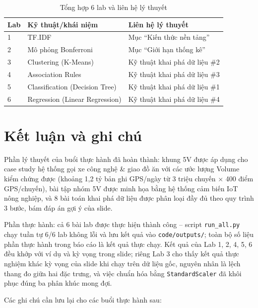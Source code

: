 \documentclass[12pt,a4paper,oneside]{article}
\begin{document}
\begin{table}[H]
\centering
\caption{Tổng hợp 6 lab và liên hệ lý thuyết}
\label{tab:tonghop}
\begin{tabularx}{\textwidth}{l X X}
\toprule
Lab & Kỹ thuật/khái niệm & Liên hệ lý thuyết \\
\midrule
1 & TF.IDF & Mục ``Kiến thức nền tảng'' \\
2 & Mô phỏng Bonferroni & Mục ``Giới hạn thống kê'' \\
3 & Clustering (K-Means) & Kỹ thuật khai phá dữ liệu \#2 \\
4 & Association Rules & Kỹ thuật khai phá dữ liệu \#3 \\
5 & Classification (Decision Tree) & Kỹ thuật khai phá dữ liệu \#1 \\
6 & Regression (Linear Regression) & Kỹ thuật khai phá dữ liệu \#4 \\
\bottomrule
\end{tabularx}
\end{table}

\section{Kết luận và ghi chú}

Phần lý thuyết của buổi thực hành đã hoàn thành: khung 5V được áp dụng cho case study hệ thống gọi xe công nghệ \& giao đồ ăn với các ước lượng Volume kiểm chứng được (khoảng 1,2 tỷ bản ghi GPS/ngày từ 3 triệu chuyến $\times$ 400 điểm GPS/chuyến), bài tập nhóm 5V được minh họa bằng hệ thống cảm biến IoT nông nghiệp, và 8 bài toán khai phá dữ liệu được phân loại đầy đủ theo quy trình 3 bước, bám đáp án gợi ý của slide.

Phần thực hành: cả 6 bài lab được thực hiện thành công -- script \texttt{run\_all.py} chạy tuần tự 6/6 lab không lỗi và lưu kết quả vào \texttt{code/outputs/}; toàn bộ số liệu phần thực hành trong báo cáo là kết quả thực chạy. Kết quả của Lab 1, 2, 4, 5, 6 đều khớp với ví dụ và kỳ vọng trong slide; riêng Lab 3 cho thấy kết quả thực nghiệm khác kỳ vọng của slide khi chạy trên dữ liệu gốc, nguyên nhân là lệch thang đo giữa hai đặc trưng, và việc chuẩn hóa bằng \texttt{StandardScaler} đã khôi phục đúng ba phân khúc mong đợi.

Các ghi chú cần lưu lại cho các buổi thực hành sau:
\end{document}
